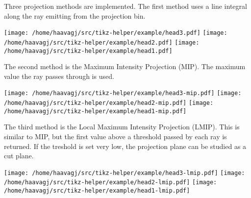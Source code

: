 \documentclass{article}
\begin{document}
Three projection methods are implemented. The first method uses a line integral along the
ray emitting from the projection bin.



\texttt{[image: /home/haavagj/src/tikz-helper/example/head3.pdf]}
\texttt{[image: /home/haavagj/src/tikz-helper/example/head2.pdf]}
\texttt{[image: /home/haavagj/src/tikz-helper/example/head1.pdf]}



The second method is the Maximum Intensity Projection (MIP). The maximum
value the ray passes through is used.



\texttt{[image: /home/haavagj/src/tikz-helper/example/head3-mip.pdf]}
\texttt{[image: /home/haavagj/src/tikz-helper/example/head2-mip.pdf]}
\texttt{[image: /home/haavagj/src/tikz-helper/example/head1-mip.pdf]}



The third method is the Local Maximum Intensity Projection (LMIP). This is
similar to MIP, but the first value above a threshold passed by each ray is returned. If the
treshold is set very low, the projection plane can be studied as a cut plane.



\texttt{[image: /home/haavagj/src/tikz-helper/example/head3-lmip.pdf]}
\texttt{[image: /home/haavagj/src/tikz-helper/example/head2-lmip.pdf]}
\texttt{[image: /home/haavagj/src/tikz-helper/example/head1-lmip.pdf]}
\end{document}
